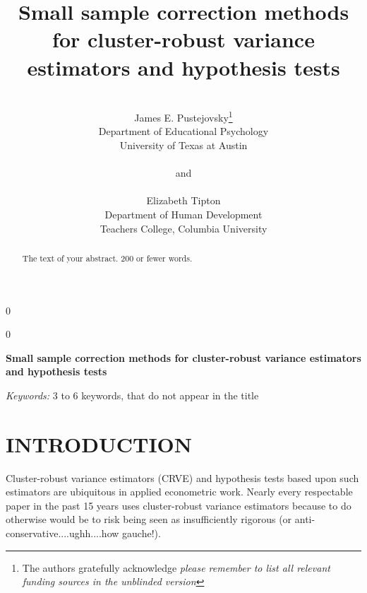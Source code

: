 \documentclass[12pt]{article}\usepackage[]{graphicx}\usepackage[]{color}
\newcommand{\blind}{0}
\begin{document}
\def\spacingset#1{\renewcommand{\baselinestretch}%
{#1}\small\normalsize} \spacingset{1}



\blind
{
  \title{\bf Small sample correction methods for cluster-robust variance estimators and hypothesis tests}
  \author{\\James E. Pustejovsky\thanks{
    The authors gratefully acknowledge \textit{please remember to list all relevant funding sources in the unblinded version}}\hspace{.2cm}\\
    Department of Educational Psychology \\ 
    University of Texas at Austin\\ \\
    and \\ \\
    Elizabeth Tipton \\
    Department of Human Development \\ 
    Teachers College, Columbia University}
  \maketitle
} \fi

\blind
{
  \bigskip
  \bigskip
  \bigskip
  \begin{center}
    {\LARGE\bf Small sample correction methods for cluster-robust variance estimators and hypothesis tests}
\end{center}
  \medskip
} \fi

\bigskip
\begin{abstract}
The text of your abstract.  200 or fewer words.
\end{abstract}

\noindent%
{\it Keywords:}  3 to 6 keywords, that do not appear in the title
\vfill

\newpage
\spacingset{1.45} %

\section{INTRODUCTION}
\label{sec:intro}



Cluster-robust variance estimators (CRVE) and hypothesis tests based upon such estimators are ubiquitous in applied econometric work. Nearly every respectable paper in the past 15 years uses cluster-robust variance estimators because to do otherwise would be to risk being seen as insufficiently rigorous (or anti-conservative....ughh....how gauche!).
\end{document}
